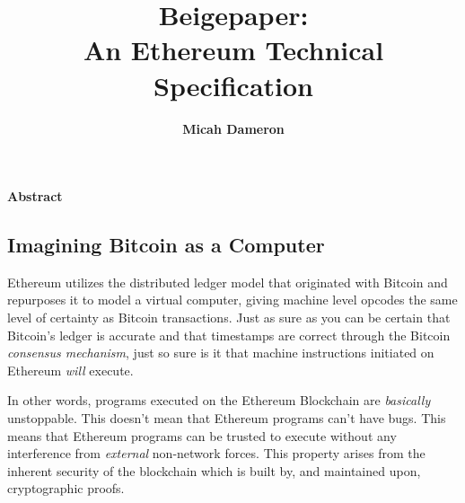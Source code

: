 \documentclass[10pt,letterpaper,leqno,bibliography=totoc]{scrartcl}
\author{\large{\textbf{Micah Dameron}}}
\date{}
\title{\LARGE{Beigepaper: \\ An Ethereum Technical Specification}}
\makeatletter
\let\mcnewpage=\newpage
\newcommand{\TrickSupertabularIntoMulticols}{%
\renewcommand\newpage{%
	      \if@firstcolumn
	            \hrule width\linewidth height0pt
          \columnbreak
      \else
        \mcnewpage
       \fi
  }%
 }
\newenvironment{alphafootnotes}
{\par\edef\savedfootnotenumber{\number\value{footnote}}
\renewcommand{\thefootnote}{\alph{footnote}}
\setcounter{footnote}{0}}
{\par\setcounter{footnote}{\savedfootnotenumber}}
\makeatother
\begin{document}

	\begin{alphafootnotes}

	\pagecolor{beige}

	\maketitle

	\begin{center}\textbf{Abstract}\end{center}\par

	\begin{multicols*}{2}
	\TrickSupertabularIntoMulticols
	\begin{justify}
	
	
	\section{Imagining Bitcoin as a Computer}
		Ethereum utilizes the distributed ledger model that originated with Bitcoin and repurposes it to model a virtual computer, giving  machine level opcodes the same level of certainty as Bitcoin transactions. Just as sure as you can be certain that Bitcoin's ledger is accurate and that timestamps are correct through the Bitcoin \textit{consensus mechanism}, just so sure is it that machine instructions initiated on Ethereum \textit{will} execute.  	      
		
		
		In other words, programs executed on the Ethereum Blockchain are \textit{basically} unstoppable. This doesn't mean that Ethereum programs can't have bugs. This means that Ethereum programs can be trusted to execute without any interference from \textit{external} non-network forces. This property arises from the inherent security of the blockchain which is built by, and maintained upon, cryptographic proofs.


\end{justify}
\end{multicols*}
\end{alphafootnotes}
\end{document}
